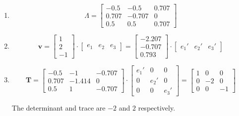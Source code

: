\begin{problem}
    \begin{enumerate} 
        \normalfont

        \item 
        $$
        \Lambda=\begin{bmatrix}
        -0.5 & -0.5 & 0.707 \\
        0.707 & -0.707 & 0 \\
        0.5 & 0.5 & 0.707
        \end{bmatrix}
        $$
        \item $$
        \mathbf{v}=
        \begin{bmatrix}
        1 \\
        2 \\
        -1
        \end{bmatrix}\cdot
        \begin{bmatrix}
        e_{1} & e_{2} & e_{3}
        \end{bmatrix}
        =\begin{bmatrix}
        -2.207 \\
        -0.707 \\
        0.793
        \end{bmatrix}\cdot
        \begin{bmatrix}
        e_{1}' & e_{2}' & e_{3}'
        \end{bmatrix}
        $$
        \item $$
        \mathbf{T}=
        \begin{bmatrix}
        -0.5 & -1 & -0.707 \\
        0.707 & -1.414 & 0 \\
        0.5 & 1 & -0.707
        \end{bmatrix}\cdot \begin{bmatrix}
        e_{1}' & 0 & 0 \\
        0 & e_{2}' & 0 \\
        0 & 0 & e_{3}'
        \end{bmatrix}=\begin{bmatrix}
        1 & 0 & 0 \\
        0 & -2 & 0 \\
        0 & 0 & -1
        \end{bmatrix}
        $$ 

        The determinant and trace are $-2$ and $2$ respectively.
    \end{enumerate}
\end{problem}
